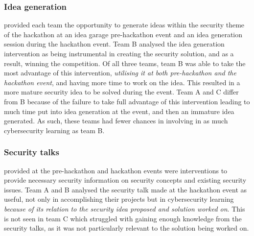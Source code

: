 \documentclass[runningheads]{llncs}
\begin{document}
\subsubsection{Idea generation} provided each team the opportunity to generate ideas within the security theme of the hackathon at an idea garage pre-hackathon event and an idea generation session during the hackathon event.
Team B analysed the idea generation intervention as being instrumental in creating the security solution, and as a result, winning the competition. Of all three teams, team B was able to take the most advantage of this intervention, \textit{utilising it at both pre-hackathon and the hackathon event}, and having more time to work on the idea. This  resulted in a more mature security idea to be solved during the event. %
Team A and C differ from B because of the failure to take full advantage of this intervention leading to much time put into idea generation at the event, and then an immature idea generated. As such, these teams had fewer chances in involving in as much cybersecurity learning as team B.

\subsubsection{Security talks} provided at the pre-hackathon and hackathon events were interventions to provide necessary security information on security concepts and existing security issues.
Team A and B analysed the security talk made at the hackathon event as useful, not only in accomplishing their projects but in cybersecurity learning \textit{because of its relation to the security idea proposed and solution worked on}. 
This is not seen in team C which struggled with gaining enough knowledge from the security talks, as it was not particularly relevant to the solution being worked on. 
\end{document}

